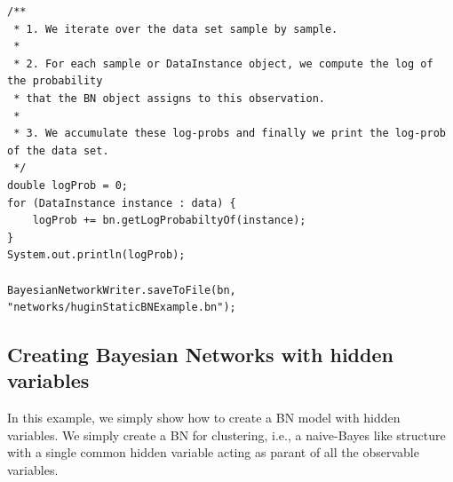 \begin{lstlisting}
/**
 * 1. We iterate over the data set sample by sample.
 *
 * 2. For each sample or DataInstance object, we compute the log of the probability 
 * that the BN object assigns to this observation.
 *
 * 3. We accumulate these log-probs and finally we print the log-prob of the data set.
 */
double logProb = 0;
for (DataInstance instance : data) {
    logProb += bn.getLogProbabiltyOf(instance);
}
System.out.println(logProb);

BayesianNetworkWriter.saveToFile(bn, "networks/huginStaticBNExample.bn");
\end{lstlisting}


\subsection{Creating Bayesian Networks with hidden variables}

In this example, we simply show how to create a BN model with hidden variables. We simply create a BN for clustering, i.e.,  a naive-Bayes like structure with a single common hidden variable acting as parant of all the observable variables.
 
